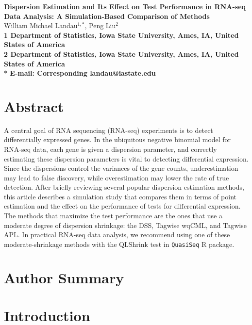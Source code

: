 \documentclass[10pt]{article}
\date{}
\begin{document}
\begin{flushleft}
{\Large
\textbf{Dispersion Estimation and Its Effect on Test Performance in RNA-seq Data Analysis: A Simulation-Based Comparison of Methods}
} \\
William Michael Landau$^{1,\ast}$,
Peng Liu$^{2}$
\\
\bf{1} Department of Statistics, Iowa State University, Ames, IA, United States of America
\\
\bf{2} Department of Statistics, Iowa State University, Ames, IA, United States of America
\\
$\ast$ E-mail: Corresponding landau@iastate.edu
\end{flushleft}

\section*{Abstract}

\paragraph{} \indent A central goal of RNA sequencing (RNA-seq) experiments is to detect differentially expressed genes. In the ubiquitous negative binomial model for RNA-seq data, each gene is given a dispersion parameter, and correctly estimating these dispersion parameters is vital to detecting differential expression. Since the dispersions control the variances of the gene counts, underestimation may lead to false discovery, while overestimation may lower the rate of true detection. After briefly reviewing several popular dispersion estimation methods, this article describes a simulation study that compares them in terms of point estimation and the effect on the performance of tests for differential expression. The methods that maximize the test performance are the ones that use a moderate degree of dispersion shrinkage: the DSS, Tagwise wqCML, and Tagwise APL. In practical RNA-seq data analysis, we recommend using one of these moderate-shrinkage methods with the QLShrink test in {\tt QuasiSeq} R package.

\section*{Author Summary}

\section*{Introduction}
\end{document}
